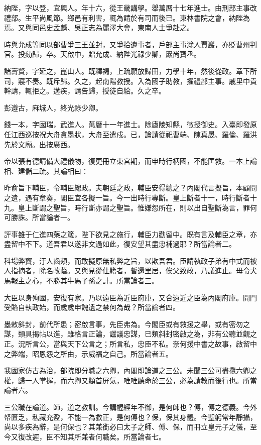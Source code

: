 \begin{pinyinscope}
納陛，字以登，宜興人。年十六，從王畿講學。舉萬曆十七年進士。由刑部主事改禮部。生平尚風節。鄉邑有利害，輒為請於有司而後已。東林書院之會，納陛為焉。又與同邑史孟麟、吳正志為麗澤大會，東南人士爭赴之。

時與允成等同以部曹爭三王並封，又爭拾遺事者，戶部主事滁人賈巖，亦貶曹州判官。投劾歸，卒。天啟中，贈允成、納陛光祿少卿，巖尚寶丞。

諸壽賢，字延之，崑山人。既釋褐，上疏願放歸田，力學十年，然後從政。章下所司，寢不奏。既斥歸。久之，起南陽教授。入為國子助教，擢禮部主事。戚里中貴幹請，輒拒之。遘疾，請告歸，授徒自給。久之卒。

彭遵古，麻城人，終光祿少卿。

錢一本，字國瑞，武進人。萬曆十一年進士。除廬陵知縣，徵授御史。入臺即發原任江西巡按祝大舟貪墨狀，大舟至遣戍。已，論請從祀曹端、陳真晟、羅倫、羅洪先於文廟。出按廣西。

帝以張有德請備大禮儀物，復更冊立東宮期，而申時行柄國，不能匡救。一本上論相、建儲二疏。其論相曰：

昨俞旨下輔臣，令輔臣總政。夫朝廷之政，輔臣安得總之？內閣代言擬旨，本顧問之遺，遇有章奏，閣臣宜各擬一旨。今一出時行專斷。皇上斷者十一，時行斷者十九。皇上斷謂之聖旨，時行斷亦謂之聖旨。惟嫌怨所在，則以出自聖斷為言，罪何可勝誅。所當論者一。

評事雒于仁進四藥之箴，陛下欲見之施行，輔臣力勸留中。既有言及輔臣之章，亦盡留中不下。道吾君以遂非文過如此，復安望其盡忠補過耶？所當論者二。

科場弊竇，汙人齒頰，而敢擬原無私弊之旨，以欺吾君。臣請執政子弟有中式而被人指摘者，除名改蔭。又與見從仕籍者，暫還里居，俟父致政，乃議進止。毋令犬馬報主之心，不勝其牛馬子孫之計。所當論者三。

大臣以身殉國，安復有家。乃以遠臣為近臣府庫，又合遠近之臣為內閣府庫。開門受賂自執政始，而歲歲申餽遺之禁何為哉？所當論者四。

墨敕斜封，前代所患；密啟言事，先臣弗為。今閣臣或有救援之舉，或有密勿之謀，類具揭帖以進，雖格言正論，讜議忠謀，已類斜封密啟之為，非有公聽並觀之正。況所言公，當與天下公言之；所言私，忠臣不私。奈何援中書之故事，啟留中之弊端，昭恩怨之所由，示威福之自己。所當論者五。

我國家仿古為治，部院即分職之六卿，內閣即論道之三公。未聞三公可盡攬六卿之權，歸一人掌握，而六卿又頫首屏氣，唯唯聽命於三公，必為請教而後行也。所當論者六。

三公職在論道。師，道之教訓。今講幄經年不御，是何師也？傅，傅之德義。今外帑匱乏，私藏充盈，不能一為救正，是何傅也？保，保其身體。今聖躬常年靜攝，尚以多疾為辭，是何保也？其兼銜必曰太子之師、傅、保，而冊立皇元子之儀，至今又復改遲，臣不知其所兼者何職矣。所當論者七。


\end{pinyinscope}
